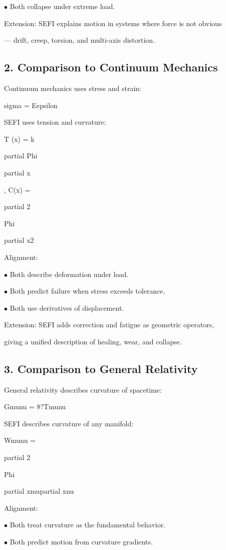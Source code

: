 \documentclass[10pt]{article}
\begin{document}
\noindent $\bullet$ Both collapse under extreme load.

Extension: SEFI explains motion in systems where force is not obvious

--- drift, creep, torsion, and multi-axis distortion.


\subsection*{2. Comparison to Continuum Mechanics}
Continuum mechanics uses stress and strain:

sigma = Eepsilon

SEFI uses tension and curvature:

T (x) = k

partial Phi

partial x

, C(x) =

partial 2

Phi

partial x2

Alignment:

\noindent $\bullet$ Both describe deformation under load.

\noindent $\bullet$ Both predict failure when stress exceeds tolerance.

\noindent $\bullet$ Both use derivatives of displacement.

Extension: SEFI adds correction and fatigue as geometric operators,

giving a unified description of healing, wear, and collapse.

\subsection*{3. Comparison to General Relativity}
General relativity describes curvature of spacetime:

Gmunu = 8?Tmunu

SEFI describes curvature of any manifold:

Wmunu =

partial 2

Phi

partial xmupartial xnu

Alignment:

\noindent $\bullet$ Both treat curvature as the fundamental behavior.

\noindent $\bullet$ Both predict motion from curvature gradients.
\end{document}
